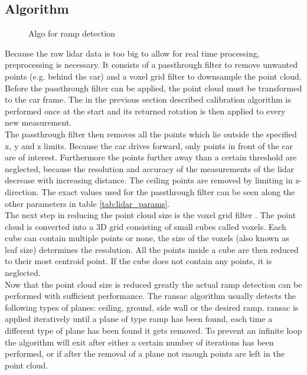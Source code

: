 \subsection{Algorithm}
\begin{figure}[htb]
    \centering
    
    \caption{Algo for ramp detection}
    \label{fig:flowchart_lidar}
\end{figure}
Because the raw \gls{lidar} data is too big to allow for real time processing, preprocessing is necessary.
It consists of a passthrough filter to remove unwanted points (e.g. behind the car) and a voxel grid filter to downsample the point cloud.
Before the passthrough filter can be applied, the point cloud must be transformed to the car frame.
The in the previous section described calibration algorithm is performed once at the start and its returned rotation is then applied to every new measurement.\\
The passthrough filter then removes all the points which lie outside the specified x, y and z limits.
Because the car drives forward, only points in front of the car are of interest.
Furthermore the points further away than a certain threshold are neglected, because the resolution and accuracy of the measurements of the \gls{lidar} decrease with increasing distance.
The ceiling points are removed by limiting in z-direction.
The exact values used for the passthrough filter can be seen along the other parameters in table \ref{tab:lidar_params}.\\
The next step in reducing the point cloud size is the voxel grid filter \cite{Vosselman2004}.
The point cloud is converted into a 3D grid consisting of small cubes called voxels.
Each cube can contain multiple points or none, the size of the voxels (also known as leaf size) determines the resolution.
All the points inside a cube are then reduced to their most centroid point.
If the cube does not contain any points, it is neglected.\\
Now that the point cloud size is reduced greatly the actual ramp detection can be performed with sufficient performance.
The \gls{ransac} algorithm usually detects the following types of planes: ceiling, ground, side wall or the desired ramp.
\gls{ransac} is applied iteratively until a plane of type ramp has been found, each time a different type of plane has been found it gets removed.
To prevent an infinite loop the algorithm will exit after either a certain number of iterations has been performed, or if after the removal of a plane not enough points are left in the point cloud.\\
